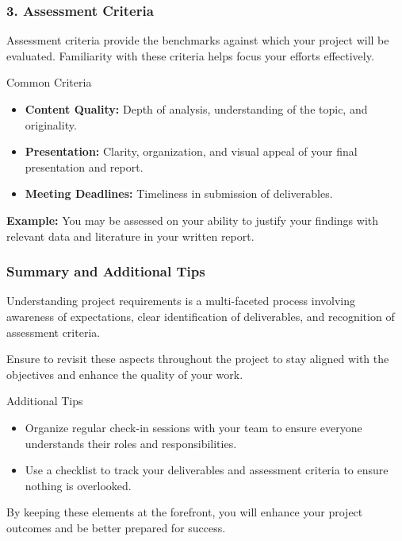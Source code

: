 \documentclass[aspectratio=169]{beamer}
\begin{document}
\begin{frame}[fragile]
    \frametitle{3. Assessment Criteria}
    Assessment criteria provide the benchmarks against which your project will be evaluated. Familiarity with these criteria helps focus your efforts effectively.

    \begin{block}{Common Criteria}
        \begin{itemize}
            \item \textbf{Content Quality:} Depth of analysis, understanding of the topic, and originality.
            \item \textbf{Presentation:} Clarity, organization, and visual appeal of your final presentation and report.
            \item \textbf{Meeting Deadlines:} Timeliness in submission of deliverables.
        \end{itemize}
    \end{block}

    \textbf{Example:} You may be assessed on your ability to justify your findings with relevant data and literature in your written report.
\end{frame}

\begin{frame}[fragile]
    \frametitle{Summary and Additional Tips}
    Understanding project requirements is a multi-faceted process involving awareness of expectations, clear identification of deliverables, and recognition of assessment criteria. 

    Ensure to revisit these aspects throughout the project to stay aligned with the objectives and enhance the quality of your work.

    \begin{block}{Additional Tips}
        \begin{itemize}
            \item Organize regular check-in sessions with your team to ensure everyone understands their roles and responsibilities.
            \item Use a checklist to track your deliverables and assessment criteria to ensure nothing is overlooked.
        \end{itemize}
    \end{block}

    By keeping these elements at the forefront, you will enhance your project outcomes and be better prepared for success.
\end{frame}
\end{document}
